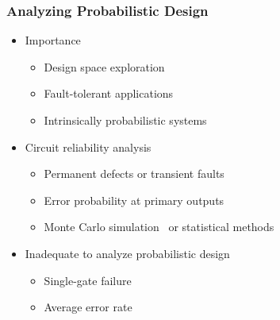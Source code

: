 \begin{frame}
      \frametitle{Analyzing Probabilistic Design}
      \begin{itemize}
            \item Importance
                  \begin{itemize}
                        \item Design space exploration
                        \item Fault-tolerant applications
                        \item Intrinsically probabilistic systems
                  \end{itemize}
                  \pause
            \item Circuit reliability analysis
                  \begin{itemize}
                        \item Permanent defects or transient faults
                        \item Error probability at primary outputs
                        \item Monte Carlo simulation~\cite{Mohanram2003} or statistical methods~\cite{Bahar2003,Krishnaswamy2005,Rejimon2005}
                  \end{itemize}
                  \pause
            \item Inadequate to analyze probabilistic design
                  \begin{itemize}
                        \item Single-gate failure
                        \item Average error rate
                  \end{itemize}
      \end{itemize}
\end{frame}